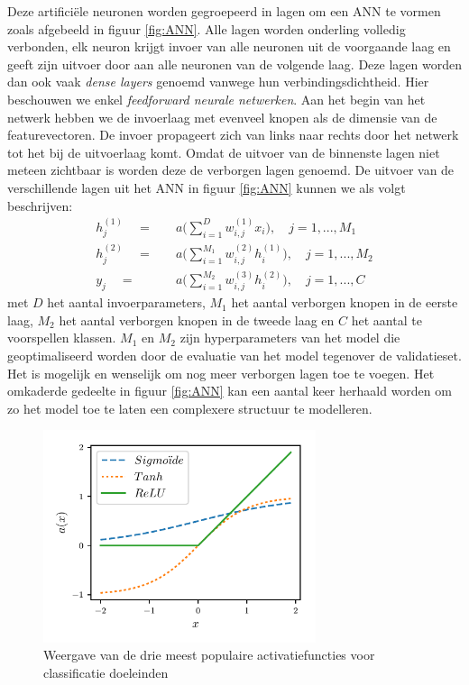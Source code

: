 \npar Deze artifici\"ele neuronen worden gegroepeerd in lagen om een ANN te vormen zoals afgebeeld in figuur \ref{fig:ANN}. Alle lagen worden onderling volledig verbonden, elk neuron krijgt invoer van alle neuronen uit de voorgaande laag en geeft zijn uitvoer door aan alle neuronen van de volgende laag. Deze lagen worden dan ook vaak \textit{dense layers} genoemd vanwege hun verbindingsdichtheid.
\npar Hier beschouwen we enkel \textit{feedforward neurale netwerken}. Aan het begin van het netwerk hebben we de invoerlaag met evenveel knopen als de dimensie van de featurevectoren. De invoer propageert zich van links naar rechts door het netwerk tot het bij de uitvoerlaag komt. Omdat de uitvoer van de binnenste lagen niet meteen zichtbaar is worden deze de verborgen lagen genoemd.
\npar De uitvoer van de verschillende lagen uit het ANN in figuur \ref{fig:ANN} kunnen we als volgt beschrijven:
\begin{equation}
\begin{aligned}
h^{(1)}_j\quad=&\quad a\bigg(\sum_{i=1}^{D}w^{(1)}_{i,j}x_i\bigg),\quad j=1,...,M_1\\
h^{(2)}_j\quad=&\quad a\bigg(\sum_{i=1}^{M_1}w^{(2)}_{i,j}h^{(1)}_i\bigg),\quad j=1,...,M_2\\ 
y_j\quad=&\quad a\bigg(\sum_{i=1}^{M_2}w^{(3)}_{i,j}h^{(2)}_i\bigg),\quad j=1,...,C 
\end{aligned}
\end{equation}
met $D$ het aantal invoerparameters, $M_1$ het aantal verborgen knopen in de eerste laag, $M_2$ het aantal verborgen knopen in de tweede laag en $C$ het aantal te voorspellen klassen. $M_1$ en $M_2$ zijn hyperparameters van het model die geoptimaliseerd worden door de evaluatie van het model tegenover de validatieset.
\npar Het is mogelijk en wenselijk om nog meer verborgen lagen toe te voegen. Het omkaderde gedeelte in figuur \ref{fig:ANN} kan een aantal keer herhaald worden om zo het model toe te laten een complexere structuur te modelleren.
\begin{figure}[ht]
	\begin{center}
		\includegraphics[width=8cm,keepaspectratio]{figuren/activatiefuncties.pdf}
		\caption{Weergave van de drie meest populaire activatiefuncties voor classificatie doeleinden \label{fig:activatie-fun}}
	\end{center}
\end{figure}
